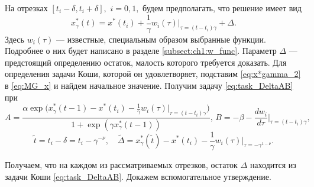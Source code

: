 На отрезках $[t_i - \delta, t_i + \delta],$ $i=0, 1,$ будем предполагать, что решение имеет вид
%
\begin{equation}
    \label{eq:x*gamma_2}
    x^*_\gamma(t) = x^*(t_i) + \frac{1}{\gamma}w_i(\tau)|_{\tau=(t-t_i)\gamma} + \Delta.
\end{equation}
%
Здесь $w_i(\tau)$ --- известные, специальным образом выбранные функции. Подробнее о них будет написано в разделе \ref{subsect:ch1:w_func}. Параметр $\Delta$ --- предстоящий определению остаток, малость которого требуется доказать. Для определения задачи Коши, которой он удовлетворяет, подставим \eqref{eq:x*gamma_2} в \eqref{eq:MG_x} и найдем начальное значение. Получим задачу \eqref{eq:task_DeltaAB} при
\begin{equation}
    \label{AB_eq:x*gamma_2}
    A=\frac{\alpha\exp\big(x_{\gamma}^*(t-1)-x^*(t_i)-\frac{1}{\gamma}w_i(\tau)|_{\tau=(t-t_i)\gamma}\big)}{1+\exp(\gamma x_{\gamma}^*(t-1))},
    \,
    B=-\beta-\frac{dw_i}{d\tau}\Big|_{\tau=(t - t_i)\gamma},
\end{equation}
%
\begin{equation}\label{tilde_eq:x*gamma_2}
    \tilde{t} = t_i - \delta = t_i - \gamma^{-\nu},\quad \tilde{\Delta}=x_{\gamma}^*(\tilde{t}) - x^*(t_i) -\frac{1}{\gamma} w_i(\tau)|_{\tau = -\gamma^{1 - \nu}}.
\end{equation}

Получаем, что на каждом из рассматриваемых отрезков, остаток $\Delta$ находится из задачи Коши \eqref{eq:task_DeltaAB}. Докажем вспомогательное утверждение.

